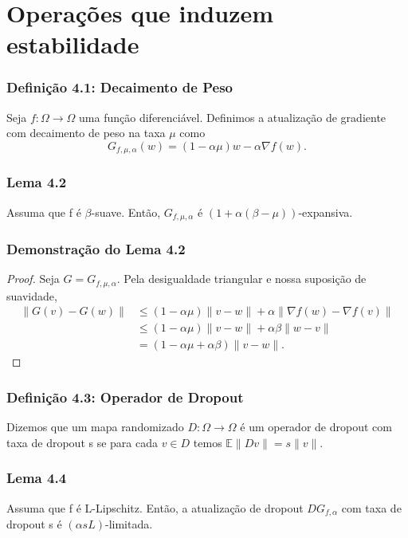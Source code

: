 \documentclass{beamer}
\newcommand{\EE}{\mathbb{E}}
\begin{document}
\section{Operações que induzem estabilidade}
\begin{frame}
\tableofcontents[currentsection]
\end{frame}

\begin{frame}
\frametitle{Definição 4.1: Decaimento de Peso}
\begin{definition}
Seja \(f:\Omega \rightarrow \Omega\) uma função diferenciável. Definimos a atualização de gradiente com decaimento de peso na taxa \(\mu\) como
$$ G_{f,\mu,\alpha}(w) = (1-\alpha\mu)w - \alpha\nabla f(w). $$ 
\end{definition}
\end{frame}

\begin{frame}
\frametitle{Lema 4.2}
\begin{lemma}
Assuma que f é \(\beta\)-suave. Então, \(G_{f,\mu,\alpha}\) é \((1+\alpha(\beta-\mu))\)-expansiva. 
\end{lemma}
\end{frame}

\begin{frame}
\frametitle{Demonstração do Lema 4.2}
\begin{proof}
Seja \(G = G_{f,\mu,\alpha}\). Pela desigualdade triangular e nossa suposição de suavidade,
\begin{align*}
\|G(v) - G(w)\| &\le (1-\alpha\mu)\|v-w\| + \alpha\|\nabla f(w) - \nabla f(v)\| \\
&\le (1-\alpha\mu)\|v-w\| + \alpha\beta\|w-v\| \\
&= (1-\alpha\mu+\alpha\beta)\|v-w\|.
\end{align*} 
\end{proof}
\end{frame}

\begin{frame}
\frametitle{Definição 4.3: Operador de Dropout}
\begin{definition}
Dizemos que um mapa randomizado \(D:\Omega \rightarrow \Omega\) é um operador de dropout com taxa de dropout s se para cada \(v \in D\) temos \(\EE\|Dv\| = s\|v\|\). 
\end{definition}
\end{frame}

\begin{frame}
\frametitle{Lema 4.4}
\begin{lemma}
Assuma que f é L-Lipschitz. Então, a atualização de dropout \(DG_{f,\alpha}\) com taxa de dropout s é \((\alpha s L)\)-limitada. 
\end{lemma}
\end{frame}
\end{document}
